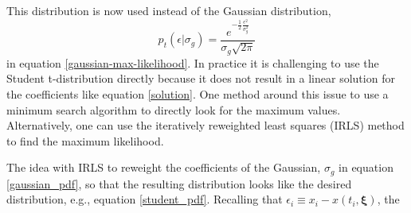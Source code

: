\documentclass[twocol]{ametsoc}
\begin{document}
This distribution is now used instead of the Gaussian distribution,
\begin{equation}
\label{gaussian_pdf}
p_t(\epsilon|\sigma_g) = \frac{e^{-\frac{1}{2}\frac{\epsilon^2}{\sigma_g^2}} }{\sigma_g \sqrt{ 2 \pi}}
\end{equation}
in equation \ref{gaussian-max-likelihood}. In practice it is challenging to use the Student t-distribution directly because it does not result in a linear solution for the coefficients like equation \ref{solution}. One method around this issue to use a minimum search algorithm to directly look for the maximum values. Alternatively, one can use the iteratively reweighted least squares (IRLS) method to find the maximum likelihood.

The idea with IRLS to reweight the coefficients of the Gaussian, $\sigma_g$ in equation \ref{gaussian_pdf}, so that the resulting distribution looks like the desired distribution, e.g., equation \ref{student_pdf}. Recalling that $\epsilon_i \equiv x_i - x(t_i,\mathbf{\xi})$, the 
\end{document}
